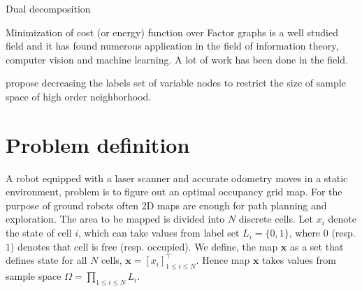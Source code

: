 \documentclass[letterpaper, 10 pt, conference]{ieeeconf} %
\newcommand{\vect}[1]{\mathbf{#1}}
\begin{document}
Dual decomposition 




Minimization of cost (or energy) function over Factor graphs is a well studied
field and it has found numerous application in the field of information theory,
computer vision and machine learning. A lot of work has been done in the field.

\cite{leonardis2006efficient}  propose decreasing the labels set of variable
nodes to restrict the size of sample space of high order neighborhood. 

\section{Problem definition}
\newcommand{\map}{\vect{x}}
\newcommand{\meas}{z}
\newcommand{\measurements}{\vect{\meas}}
\newcommand{\pose}{g}
\newcommand{\poses}{\vect{\pose}}
\newcommand{\unaryminus}{\scalebox{0.5}[0.5]{\( - \)}}
\newcommand{\prevtime}{1:t\unaryminus1}
\newcommand{\pastobs}{\measurements_{1:t\unaryminus1}, \poses_{1:t\unaryminus1}}
A robot equipped with a laser scanner and accurate odometry moves in a static
environment, problem is to figure out an optimal occupancy grid map. For the
purpose of ground robots often 2D maps are enough for path planning and
exploration.
The area to be mapped is divided into $N$ discrete cells. Let $x_i$ denote the
state of cell $i$, which can take values from label set $L_i = \{0, 1\}$, where
$0$ (resp. $1$) denotes that cell is free (resp. occupied). We define, the map
$\map$ as a set that defines state for all $N$ cells, $\map = [x_i]^\top_{1
\le i \le N}$. Hence map $\map$ takes values from sample space $\Omega =
\prod_{1 \le i \le N}L_i$.
\end{document}
